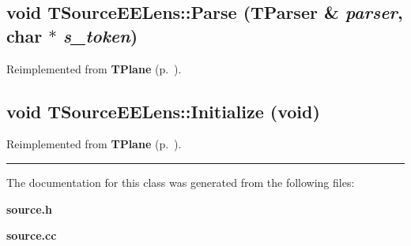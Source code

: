 \subsection{\setlength{\rightskip}{0pt plus 5cm}void TSource\-EELens::Parse ({\bf TParser} \& {\em parser}, char $\ast$ {\em s\_\-token})\hspace{0.3cm}{\tt  [virtual]}}



Reimplemented from {\bf TPlane} {\rm (p.~\pageref{TPlane_a2})}.\label{TSourceEELens_a2}
\subsection{\setlength{\rightskip}{0pt plus 5cm}void TSource\-EELens::Initialize (void)\hspace{0.3cm}{\tt  [virtual]}}



Reimplemented from {\bf TPlane} {\rm (p.~\pageref{TPlane_a3})}.\vspace{0.4cm}\hrule\vspace{0.2cm}
The documentation for this class was generated from the following files:\begin{CompactItemize}
\item 
{\bf source.h}\item 
{\bf source.cc}\end{CompactItemize}
